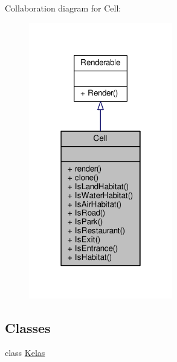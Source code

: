 Collaboration diagram for Cell\+:
\nopagebreak
\begin{figure}[H]
\begin{center}
\leavevmode
\includegraphics[width=178pt]{classCell__coll__graph}
\end{center}
\end{figure}
\subsection*{Classes}
\begin{DoxyCompactItemize}
\item 
class \hyperlink{classCell_1_1Kelas}{Kelas}
\end{DoxyCompactItemize}
